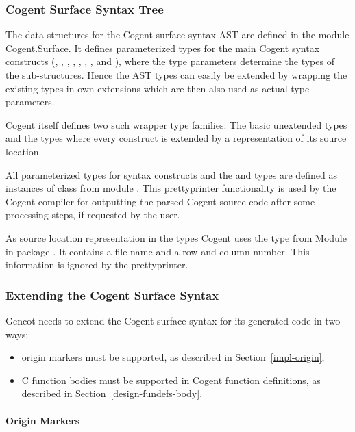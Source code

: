 \subsubsection{Cogent Surface Syntax Tree}

The data structures for the Cogent surface syntax AST are defined in the module Cogent.Surface. It defines parameterized types
for the main Cogent syntax constructs (, , , , , 
, , and ), where the type parameters determine the types of the 
sub-structures. Hence the AST types
can easily be extended by wrapping the existing types in own extensions which are then also used as actual type parameters.

Cogent itself defines two such wrapper type families: The basic unextended types  and the types 
where every construct is extended by a representation of its source location. 

All parameterized types for syntax constructs and the  and  types are defined as instances of 
class  from
module . This prettyprinter functionality is used by the Cogent compiler for outputting
the parsed Cogent source code after some processing steps, if requested by the user.

As source location representation in the  types Cogent uses the type  from Module 
 in package .
It contains a file name and a row and column number. This information is ignored by the prettyprinter.

\subsubsection{Extending the Cogent Surface Syntax}

Gencot needs to extend the Cogent surface syntax for its generated code in two ways:
\begin{itemize}
\item origin markers must be supported, as described in Section~\ref{impl-origin},
\item C function bodies must be supported in Cogent function definitions, as described in Section~\ref{design-fundefs-body}.
\end{itemize}

\paragraph{Origin Markers}


